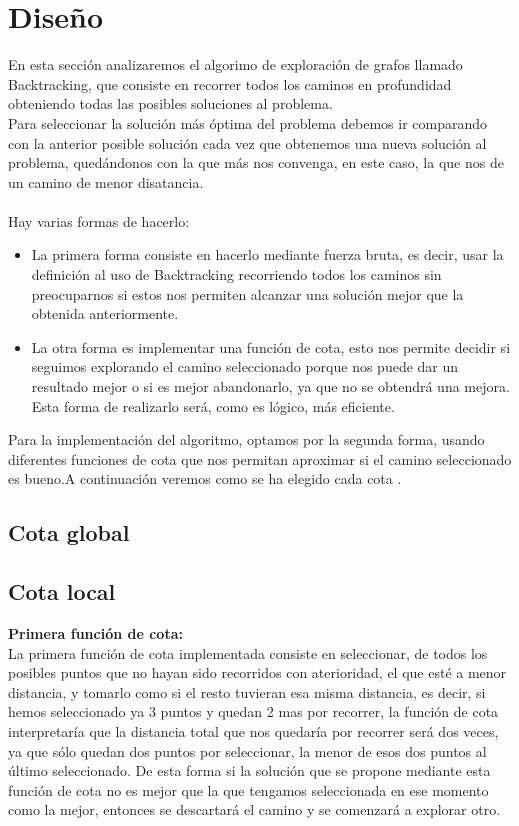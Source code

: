 \documentclass[11pt,openany]{book}
\begin{document}
\section{Diseño}   
En esta sección analizaremos el algorimo de exploración de grafos llamado Backtracking, que consiste en recorrer todos los caminos en profundidad obteniendo todas
las posibles soluciones al problema. \\
Para seleccionar la solución más óptima del problema debemos ir comparando con la anterior posible solución  cada vez que obtenemos una nueva solución al problema, quedándonos con la que más nos
convenga, en este caso, la que nos de un camino de menor disatancia.
\\ \\
Hay varias formas de hacerlo:
\begin{itemize}
      \item La primera forma consiste en hacerlo mediante fuerza bruta, es decir, usar la definición al uso de Backtracking recorriendo todos los caminos sin preocuparnos
      si estos nos permiten alcanzar una solución mejor que la obtenida anteriormente.
      \item La otra forma es implementar una función de cota, esto nos permite decidir si seguimos explorando el camino seleccionado porque nos puede dar un resultado mejor
      o si es mejor abandonarlo, ya que no se obtendrá una mejora.
      Esta forma de realizarlo será, como es lógico, más eficiente.
\end{itemize}

Para la implementación del algoritmo, optamos por la segunda forma, usando diferentes funciones de cota que nos permitan aproximar si el camino seleccionado es bueno.A continuación
veremos como se ha elegido cada cota .
\subsection{Cota global}
\subsection{Cota local}
\textbf{Primera función de cota:} \\
    La primera función de cota implementada consiste en seleccionar, de todos los posibles puntos  que no hayan sido recorridos con aterioridad, el que esté a menor distancia, y tomarlo como si el resto tuvieran esa misma distancia,
    es decir, si hemos seleccionado ya 3 puntos y quedan 2 mas por recorrer, la función de cota interpretaría que la distancia total que nos quedaría por recorrer será dos veces, ya que sólo quedan dos puntos por seleccionar, la menor de esos dos puntos al último seleccionado.
    De esta forma si la solución que se propone mediante esta función de cota no es mejor que la que tengamos seleccionada en ese momento como la mejor, entonces se descartará el camino y se comenzará a explorar otro.
\end{document}
